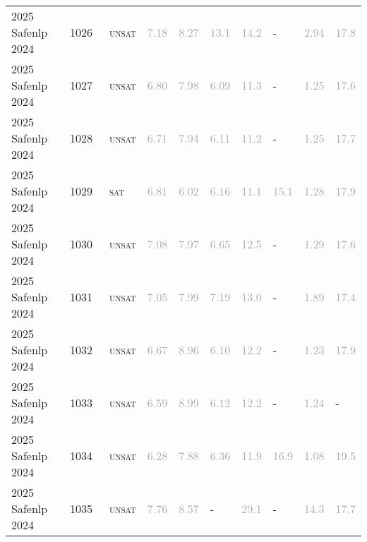 \begin{center}
{\begin{longtable}{@{}llllllllll@{}}
2025 Safenlp 2024 & 1026 & ~\textsc{unsat} & \textcolor{darkgray}{7.18} & \textcolor{darkgray}{8.27} & \textcolor{darkgray}{13.1} & \textcolor{darkgray}{14.2} & - & \textcolor{darkgray}{2.94} & \textcolor{darkgray}{17.8} \\
2025 Safenlp 2024 & 1027 & ~\textsc{unsat} & \textcolor{darkgray}{6.80} & \textcolor{darkgray}{7.98} & \textcolor{darkgray}{6.09} & \textcolor{darkgray}{11.3} & - & \textcolor{darkgray}{1.25} & \textcolor{darkgray}{17.6} \\
2025 Safenlp 2024 & 1028 & ~\textsc{unsat} & \textcolor{darkgray}{6.71} & \textcolor{darkgray}{7.94} & \textcolor{darkgray}{6.11} & \textcolor{darkgray}{11.2} & - & \textcolor{darkgray}{1.25} & \textcolor{darkgray}{17.7} \\
2025 Safenlp 2024 & 1029 & ~\textsc{sat} & \textcolor{darkgray}{6.81} & \textcolor{darkgray}{6.02} & \textcolor{darkgray}{6.16} & \textcolor{darkgray}{11.1} & \textcolor{darkgray}{15.1} & \textcolor{darkgray}{1.28} & \textcolor{darkgray}{17.9} \\
2025 Safenlp 2024 & 1030 & ~\textsc{unsat} & \textcolor{darkgray}{7.08} & \textcolor{darkgray}{7.97} & \textcolor{darkgray}{6.65} & \textcolor{darkgray}{12.5} & - & \textcolor{darkgray}{1.29} & \textcolor{darkgray}{17.6} \\
2025 Safenlp 2024 & 1031 & ~\textsc{unsat} & \textcolor{darkgray}{7.05} & \textcolor{darkgray}{7.99} & \textcolor{darkgray}{7.19} & \textcolor{darkgray}{13.0} & - & \textcolor{darkgray}{1.89} & \textcolor{darkgray}{17.4} \\
2025 Safenlp 2024 & 1032 & ~\textsc{unsat} & \textcolor{darkgray}{6.67} & \textcolor{darkgray}{8.96} & \textcolor{darkgray}{6.10} & \textcolor{darkgray}{12.2} & - & \textcolor{darkgray}{1.23} & \textcolor{darkgray}{17.9} \\
2025 Safenlp 2024 & 1033 & ~\textsc{unsat} & \textcolor{darkgray}{6.59} & \textcolor{darkgray}{8.99} & \textcolor{darkgray}{6.12} & \textcolor{darkgray}{12.2} & - & \textcolor{darkgray}{1.24} & - \\
2025 Safenlp 2024 & 1034 & ~\textsc{unsat} & \textcolor{darkgray}{6.28} & \textcolor{darkgray}{7.88} & \textcolor{darkgray}{6.36} & \textcolor{darkgray}{11.9} & \textcolor{darkgray}{16.9} & \textcolor{darkgray}{1.08} & \textcolor{darkgray}{19.5} \\
2025 Safenlp 2024 & 1035 & ~\textsc{unsat} & \textcolor{darkgray}{7.76} & \textcolor{darkgray}{8.57} & - & \textcolor{darkgray}{29.1} & - & \textcolor{darkgray}{14.3} & \textcolor{darkgray}{17.7} \\

\end{longtable}}
\end{center}
